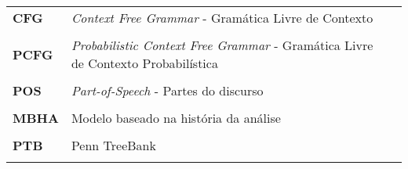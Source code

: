 
\begin{longtable}{llp{12cm}}
{\bf CFG}     &   \emph{Context Free Grammar} - Gramática Livre de Contexto  \\ \\
{\bf PCFG}    &   \emph{Probabilistic Context Free Grammar} - Gramática Livre de Contexto Probabilística\\ \\
{\bf POS}     &   \emph{Part-of-Speech} - Partes do discurso\\ \\
{\bf MBHA}    &   Modelo baseado na história da análise\\ \\
{\bf PTB}    &   Penn TreeBank\\ \\
\end{longtable}
